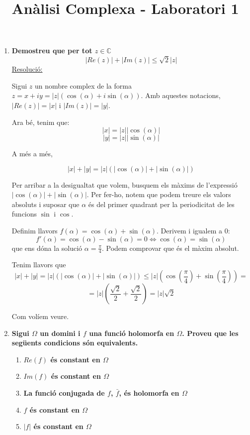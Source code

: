 \documentclass[10pt,a4paper]{article}
\author{ }
\title{Anàlisi Complexa - Laboratori 1}
\begin{document}
\maketitle

\begin{enumerate}
\item \textbf{Demostreu que per tot $z\in\mathbb{C}$
$$|Re(z)|+|Im(z)|\leq\sqrt{2}|z|$$}
\underline{Resolució:}

Sigui $z$ un nombre complex de la forma $z=x+iy=|z|(\cos(\alpha)+i\sin(\alpha))$. Amb aquestes notacions, $|Re(z)|=|x|$ i $|Im(z)|=|y|$.

Ara bé, tenim que:
$$|x| = |z||\cos(\alpha)|$$
$$|y| = |z||\sin(\alpha)|$$

A més a més,

$$|x|+|y| = |z|(|\cos(\alpha)| + |\sin(\alpha)|)$$

Per arribar a la desigualtat que volem, busquem els màxims de l'expressió $|\cos(\alpha)| + |\sin(\alpha)|$. Per fer-ho, notem que podem treure els valors absoluts i suposar que $\alpha$ és del primer quadrant per la periodicitat de les funcions $\sin$ i $\cos$.

Definim llavors $f(\alpha)=\cos(\alpha) + \sin(\alpha)$. Derivem i igualem a 0:
$$f'(\alpha) = \cos(\alpha)-\sin(\alpha)=0 \Leftrightarrow \cos(\alpha)=\sin(\alpha)$$ que ens dóna la solució $\alpha=\frac{\pi}{4}$. Podem comprovar que és el màxim absolut.

Tenim llavors que $$|x|+|y| = \left|z\right|\left(\left|\cos\left(\alpha\right)\right| + \left|\sin\left(\alpha\right)\right|\right) \leq \left|z\right|\left(\cos\left(\frac{\pi}{4}\right) + \sin\left(\frac{\pi}{4}\right)\right) =$$ 
$$= |z|\left(\frac{\sqrt{2}}{2}+\frac{\sqrt{2}}{2}\right) = |z|\sqrt{2}$$

Com volíem veure.

\item \textbf{Sigui $\Omega$ un domini i $f$ una funció holomorfa en $\Omega$. Proveu que les següents condicions són equivalents.}

\begin{enumerate}
\item \textbf{$Re(f)$ és constant en $\Omega$}
\item \textbf{$Im(f)$ és constant en $\Omega$}
\item \textbf{La funció conjugada de $f$, $\bar{f}$, és holomorfa en $\Omega$}
\item \textbf{$f$ és constant en $\Omega$}
\item \textbf{$|f|$ és constant en $\Omega$}
\end{enumerate}


\end{enumerate}
\end{document}
